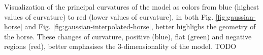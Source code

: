Visualization of the principal curvatures of the model as colors from blue (highest values of curvature) to red (lower values of curvature), in both Fig. \ref{fig:gaussian-horse} and Fig. \ref{fig:gaussian-interpolated-horse}, better highlighs the geometry of the horse.
These changes of curvature, positive (blue), flat (green) and negative regions (red), better emphasises the 3-dimensionality of the model.
TODO
